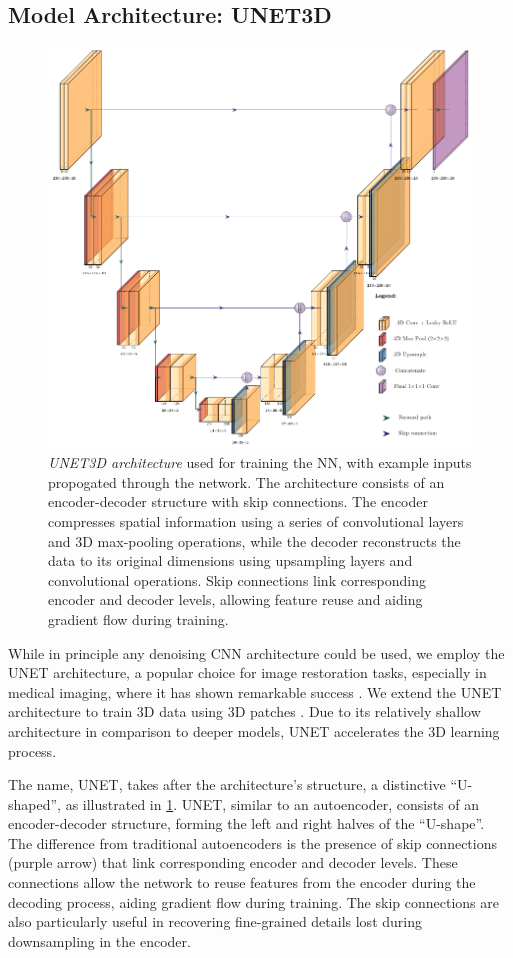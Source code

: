 \subsection{Model Architecture: UNET3D}
\begin{figure}
    \centering
    \includegraphics[width=0.8\linewidth]{images/unet_architecture.pdf}
    \caption{\textit{UNET3D architecture} used for training the \gls{NN}, with example inputs propogated through the network. The architecture consists of an encoder-decoder structure with skip connections. The encoder compresses spatial information using a series of convolutional layers and 3D max-pooling operations, while the decoder reconstructs the data to its original dimensions using upsampling layers and convolutional operations. Skip connections link corresponding encoder and decoder levels, allowing feature reuse and aiding gradient flow during training.}
    \label{fig:unet-architecture}
\end{figure}

While in principle any denoising \gls{CNN} architecture could be used, we employ the UNET architecture, a popular choice for image restoration tasks, especially in medical imaging, where it has shown remarkable success \cite{ronnebergerUNetConvolutionalNetworks}. We extend the UNET architecture to train 3D data using 3D patches \cite{cicek3DUNetLearning2016}. Due to its relatively shallow architecture in comparison to deeper models, UNET accelerates the 3D learning process.

The name, UNET, takes after the architecture’s structure, a distinctive “U-shaped”, as illustrated in \cref{fig:unet-architecture}. UNET, similar to an autoencoder, consists of an encoder-decoder structure, forming the left and right halves of the “U-shape”. The difference from traditional autoencoders is the presence of skip connections (purple arrow) that link corresponding encoder and decoder levels. These connections allow the network to reuse features from the encoder during the decoding process, aiding gradient flow during training. The skip connections are also particularly useful in recovering fine-grained details lost during downsampling in the encoder.


